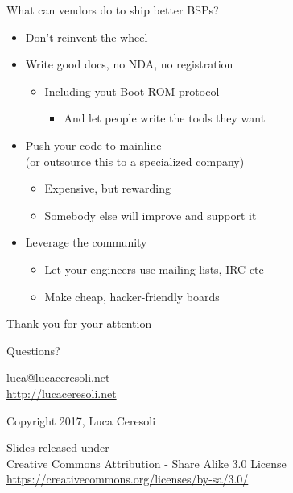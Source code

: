 \documentclass[xetex,table]{beamer}
\begin{document}
\begin{frame}{What can vendors do to ship better BSPs?}
  \begin{itemize}
  \item Don't reinvent the wheel
  \item Write good docs, no NDA, no registration
    \begin{itemize}
    \item Including yout Boot ROM protocol
      \begin{itemize}
      \item And let people write the tools they want
      \end{itemize}
    \end{itemize}
  \item Push your code to mainline\\
    {\small (or outsource this to a specialized company)}
    \begin{itemize}
    \item Expensive, but rewarding
    \item Somebody else will improve and support it
    \end{itemize}
  \item Leverage the community
    \begin{itemize}
    \item Let your engineers use mailing-lists, IRC etc
    \item Make cheap, hacker-friendly boards
    \end{itemize}
  \end{itemize}
\end{frame}

\begin{frame}
  \begin{center}
    Thank you for your attention

    \vspace{0.15\textheight}

    {\Huge Questions?}

    \vspace{0.15\textheight}

    \href{mailto:luca@lucaceresoli.net}{luca@lucaceresoli.net}\\
    \url{http://lucaceresoli.net}

    \textcopyright{} Copyright 2017, Luca Ceresoli\\

    \vspace{0.05\textheight}

    \tiny
    Slides released under\\
    Creative Commons Attribution - Share Alike 3.0 License \\
    \url{https://creativecommons.org/licenses/by-sa/3.0/} \\
\end{center}
\end{frame}
\end{document}
